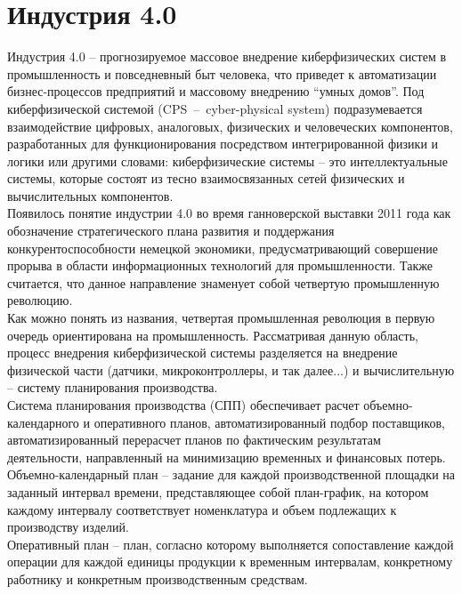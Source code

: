 \section{Индустрия 4.0}
Индустрия 4.0 -- прогнозируемое массовое внедрение киберфизических систем в промышленность и повседневный быт человека, что приведет к автоматизации бизнес-процессов предприятий и массовому внедрению ``умных домов''.
Под киберфизической системой (CPS~--~cyber-physical system) подразумевается взаимодействие цифровых, аналоговых, физических и человеческих компонентов, разработанных для функционирования посредством интегрированной физики и логики или другими словами: киберфизические системы -- это интеллектуальные системы, которые состоят из тесно взаимосвязанных сетей физических и вычислительных компонентов\cite{nist}.\\
\indent Появилось понятие индустрии 4.0 во время ганноверской выставки 2011 года как обозначение стратегического плана развития и поддержания конкурентоспособности немецкой экономики, предусматривающий совершение прорыва в области информационных технологий для промышленности.
Также считается, что данное направление знаменует собой четвертую промышленную революцию\cite{industry}.\\
\indent Как можно понять из названия, четвертая промышленная революция в первую очередь ориентирована на промышленность.
Рассматривая данную область, процесс внедрения киберфизической системы разделяется на внедрение физической части (датчики, микроконтроллеры, и так далее...) и вычислительную -- систему планирования производства.\\
\indent Система планирования производства (СПП) обеспечивает расчет объемно-календарного и оперативного планов, автоматизированный подбор поставщиков, автоматизированный перерасчет планов по фактическим результатам деятельности, направленный на минимизацию временных и финансовых потерь.\\
\indent Объемно-календарный план -- задание для каждой производственной площадки на заданный интервал времени, представляющее собой план-график, на котором каждому интервалу соответствует номенклатура и объем подлежащих к производству изделий\cite{niokr}.\\
\indent Оперативный план -- план, согласно которому выполняется сопоставление каждой операции для каждой единицы продукции к временным интервалам, конкретному работнику и конкретным производственным средствам\cite{niokr}.\\
